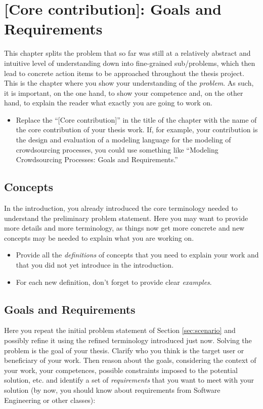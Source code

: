 \chapter{[Core contribution]: Goals and Requirements}
\label{capitolo3}
\thispagestyle{empty}


This chapter splits the problem that so far was still at a relatively abstract and intuitive level of understanding down into fine-grained sub/problems, which then lead to concrete action items to be approached throughout the thesis project. This is the chapter where you show your understanding of the \emph{problem}. As such, it is important, on the one hand, to show your competence and, on the other hand, to explain the reader what exactly you are going to work on.

\begin{itemize}
\item[\Square] Replace the ``[Core contribution]'' in the title of the chapter with the name of the core contribution of your thesis work. If, for example, your contribution is the design and evaluation of a modeling language for the modeling of crowdsourcing processes, you could use something like ``Modeling Crowdsourcing Processes: Goals and Requirements.''
\end{itemize}



\section{Concepts}
In the introduction, you already introduced the core terminology needed to understand the preliminary problem statement. Here you may want to provide more details and more terminology, as things now get more concrete and new concepts may be needed to explain what you are working on.

\begin{itemize}
\item[\Square] Provide all the \emph{definitions} of concepts that you need to explain your work and that you did not yet introduce in the introduction.
\item[\Square] For each new definition, don't forget to provide clear \emph{examples}. 
\end{itemize}



\section{Goals and Requirements}
Here you repeat the initial problem statement of Section \ref{sec:scenario} and possibly refine it using the refined terminology introduced just now. Solving the problem is the goal of your thesis. Clarify who you think is the target user or beneficiary of your work. Then reason about the goals, considering the context of your work, your competences, possible constraints imposed to the potential solution, etc. and identify a set of \emph{requirements} that you want to meet with your solution (by now, you should know about requirements from Software Engineering or other classes):


